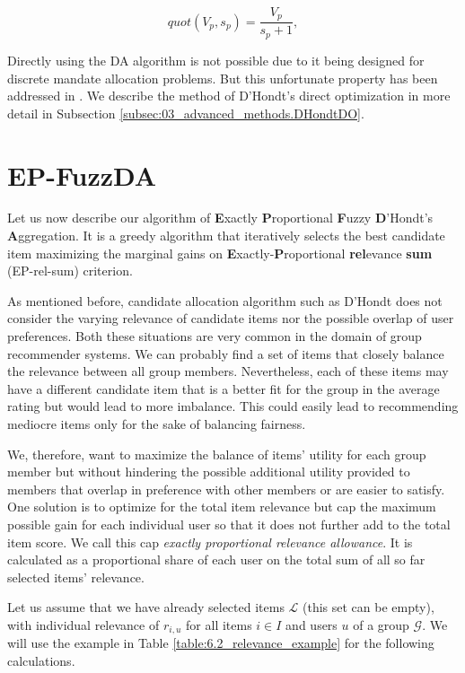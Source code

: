 \begin{equation}
    quot(V_p, s_p) = \dfrac{V_p}{s_p + 1},
\end{equation}

Directly using the DA algorithm is not possible due to it being designed for discrete mandate allocation problems. But this unfortunate property has been addressed in \cite{fuzz_da}. We describe the method of D'Hondt's direct optimization in more detail in Subsection \ref{subsec:03_advanced_methods.DHondtDO}.

\section{EP-FuzzDA}

Let us now describe our algorithm of \textbf{E}xactly \textbf{P}roportional \textbf{F}uzzy \textbf{D}'Hondt's \textbf{A}ggregation. It is a greedy algorithm that iteratively selects the best candidate item maximizing the marginal gains on \textbf{E}xactly-\textbf{P}roportional \textbf{rel}evance \textbf{sum} (EP-rel-sum) criterion.

As mentioned before, candidate allocation algorithm such as D'Hondt does not consider the varying relevance of candidate items nor the possible overlap of user preferences. Both these situations are very common in the domain of group recommender systems. We can probably find a set of items that closely balance the relevance between all group members. Nevertheless, each of these items may have a different candidate item that is a better fit for the group in the average rating but would lead to more imbalance. This could easily lead to recommending mediocre items only for the sake of balancing fairness.

We, therefore, want to maximize the balance of items' utility for each group member but without hindering the possible additional utility provided to members that overlap in preference with other members or are easier to satisfy. One solution is to optimize for the total item relevance but cap the maximum possible gain for each individual user so that it does not further add to the total item score. We call this cap \textit{exactly proportional relevance allowance}. It is calculated as a proportional share of each user on the total sum of all so far selected items' relevance.


Let us assume that we have already selected items $\mathcal{L}$ (this set can be empty), with individual relevance of $r_{i,u}$ for all items $i \in I$ and users $u$ of a group $\mathcal{G}$. We will use the example in Table \ref{table:6.2_relevance_example} for the following calculations.

